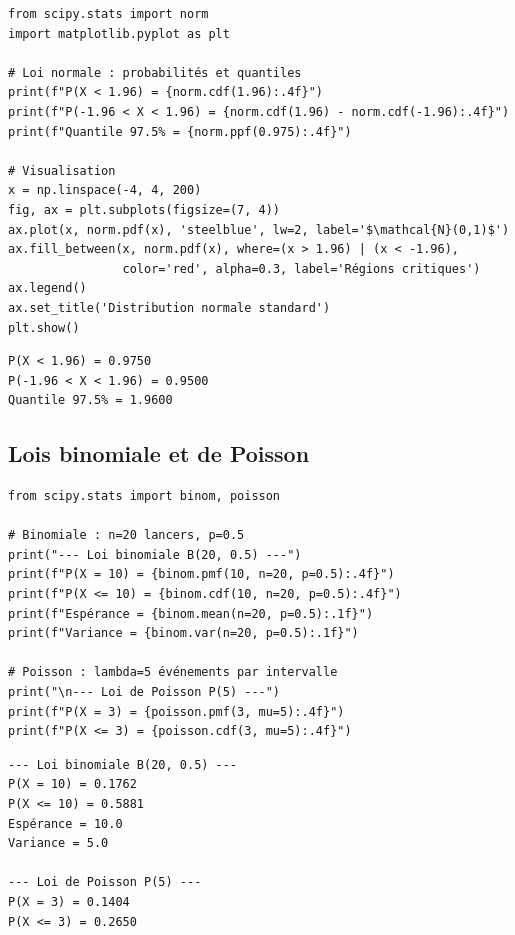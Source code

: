 \begin{codeblock}[title=\textbf{Python}]
\begin{verbatim}
from scipy.stats import norm
import matplotlib.pyplot as plt

# Loi normale : probabilités et quantiles
print(f"P(X < 1.96) = {norm.cdf(1.96):.4f}")
print(f"P(-1.96 < X < 1.96) = {norm.cdf(1.96) - norm.cdf(-1.96):.4f}")
print(f"Quantile 97.5% = {norm.ppf(0.975):.4f}")

# Visualisation
x = np.linspace(-4, 4, 200)
fig, ax = plt.subplots(figsize=(7, 4))
ax.plot(x, norm.pdf(x), 'steelblue', lw=2, label='$\mathcal{N}(0,1)$')
ax.fill_between(x, norm.pdf(x), where=(x > 1.96) | (x < -1.96),
                color='red', alpha=0.3, label='Régions critiques')
ax.legend()
ax.set_title('Distribution normale standard')
plt.show()
\end{verbatim}
\end{codeblock}

\begin{codeoutput}
\begin{verbatim}
P(X < 1.96) = 0.9750
P(-1.96 < X < 1.96) = 0.9500
Quantile 97.5% = 1.9600
\end{verbatim}
\end{codeoutput}

\subsection{Lois binomiale et de Poisson}

\begin{codeblock}[title=\textbf{Python}]
\begin{verbatim}
from scipy.stats import binom, poisson

# Binomiale : n=20 lancers, p=0.5
print("--- Loi binomiale B(20, 0.5) ---")
print(f"P(X = 10) = {binom.pmf(10, n=20, p=0.5):.4f}")
print(f"P(X <= 10) = {binom.cdf(10, n=20, p=0.5):.4f}")
print(f"Espérance = {binom.mean(n=20, p=0.5):.1f}")
print(f"Variance = {binom.var(n=20, p=0.5):.1f}")

# Poisson : lambda=5 événements par intervalle
print("\n--- Loi de Poisson P(5) ---")
print(f"P(X = 3) = {poisson.pmf(3, mu=5):.4f}")
print(f"P(X <= 3) = {poisson.cdf(3, mu=5):.4f}")
\end{verbatim}
\end{codeblock}

\begin{codeoutput}
\begin{verbatim}
--- Loi binomiale B(20, 0.5) ---
P(X = 10) = 0.1762
P(X <= 10) = 0.5881
Espérance = 10.0
Variance = 5.0

--- Loi de Poisson P(5) ---
P(X = 3) = 0.1404
P(X <= 3) = 0.2650
\end{verbatim}
\end{codeoutput}

